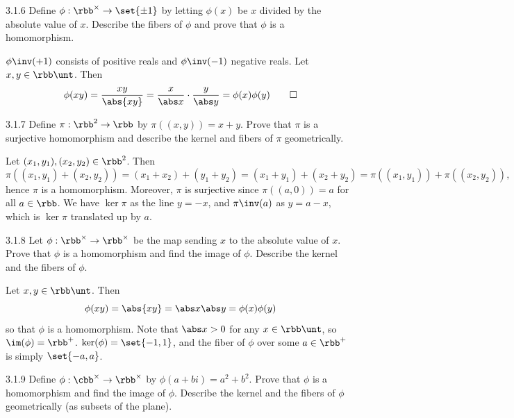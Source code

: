 \begin{exercise}{3.1.6}
    Define $\phi : \rbb^{\times} \to \set{\pm 1}$ by letting $\phi(x)$ be $x$ divided by the absolute value of $x$.
	Describe the fibers of $\phi$ and prove that $\phi$ is a homomorphism.
\end{exercise}

\begin{sol}
    $\phi\inv(+1)$ consists of positive reals and $\phi\inv(-1)$ negative reals.
	Let $x, y \in \rbb\unt$.
	Then
    \[
    	\phi(xy) = \frac{xy}{\abs{xy}} = \frac{x}{\abs x} \cdot \frac{y}{\abs y} = \phi(x)\phi(y) \qedhere
    \]
\end{sol}

\begin{exercise}{3.1.7}
    Define $\pi : \rbb^2 \to \rbb$ by $\pi((x,y)) = x + y$.
	Prove that $\pi$ is a surjective homomorphism and describe the kernel and fibers of $\pi$ geometrically.
\end{exercise}

\begin{sol}
    Let $(x_1, y_1), (x_2, y_2) \in \rbb^2$.
	Then
    \[
    	\pi((x_1, y_1) + (x_2, y_2)) = (x_1 + x_2) + (y_1 + y_2) = (x_1 + y_1) + (x_2 + y_2) = \pi((x_1, y_1)) + \pi((x_2, y_2)),
    \]
    hence $\pi$ is a homomorphism.
	Moreover, $\pi$ is surjective since $\pi((a, 0)) = a$ for all $a \in \rbb$.
	We have $\ker\pi$ as the line $y = -x$, and $\pi\inv(a)$ as $y = a - x$, which is $\ker\pi$ translated up by $a$.
\end{sol}

\begin{exercise}{3.1.8}
    Let $\phi : \rbb^{\times} \to \rbb^{\times}$ be the map sending $x$ to the absolute value of $x$.
	Prove that $\phi$ is a homomorphism and find the image of $\phi$.
	Describe the kernel and the fibers of $\phi$.
\end{exercise}

\begin{sol}
    Let $x, y \in \rbb\unt$.
	Then
    \[
    	\phi(xy) = \abs{xy} = \abs x \abs y = \phi(x)\phi(y)
    \]
    so that $\phi$ is a homomorphism.
	Note that $\abs x > 0$ for any $x \in \rbb\unt$, so $\im(\phi) = \rbb^+$. $\ker(\phi) = \set{-1, 1}$, and the fiber of $\phi$ over some $a \in \rbb^+$ is simply $\set{-a, a}$.
\end{sol}

\begin{exercise}{3.1.9}
    Define $\phi : \cbb^{\times} \to \rbb^{\times}$ by $\phi(a+bi) = a^2 + b^2$.
	Prove that $\phi$ is a homomorphism and find the image of $\phi$.
	Describe the kernel and the fibers of $\phi$ geometrically (as subsets of the plane).
\end{exercise}

